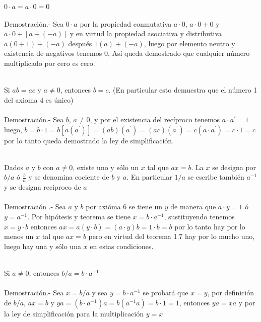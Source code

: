 \begin{teo}
$0\cdot a = a\cdot 0 =0$\\\\
Demostración.- \;
Sea $0\cdot a$ por la propiedad conmutativa $a\cdot 0$, $a\cdot 0 + 0$ y $a\cdot 0 + \left[a+(-a) \right]$ y en virtud la propiedad asociativa y distributiva $a(0 + 1)+(-a)$ después $1(a)+(-a)$, luego por elemento neutro y existencia de negativos tenemos $0$, Así queda demostrado que cualquier número multiplicado por cero es cero.\\\\ 
\end{teo}

\begin{teo} Si $ab=ac$ y $a \neq 0$, entonces $b=c$. (En particular esto demuestra que el número 1 del axioma 4 es único)\\\\
Demostración.- \;
Sea $b$, $a\neq 0$, y por el existencia del recíproco tenemos $a\cdot a^{'}=1 $  luego,  $b=b\cdot 1=b\left[a(a^{'})\right]=(ab)(a^{'})=(ac)(a^{'})=c(a\cdot a^{'})=c\cdot 1=c$ por lo tanto queda demostrado la ley de simplificación.\\\\
\end{teo}

\begin{teo} Dados $a$ y $b$ con $a\neq 0$, existe uno y sólo un $x$ tal que $ax=b$. La $x$ se designa por $b/a$ ó $\displaystyle\frac{b}{a}$ y se denomina cociente de $b$ y $a$. En particular $1/a$ se escribe también $a^{-1}$ y se designa recíproco de $a$\\\\
Demostración .- \;
Sea $a$ y $b$ por axióma 6 se tiene un $y$ de manera que $a\cdot y = 1$ ó $y = a^{-1}$. Por hipótesis y teorema se tiene $x=b\cdot a^{-1}$, sustituyendo tenemos $x=y\cdot b$ entonces $ax=a(y\cdot b)=(a\cdot y)b=1\cdot b = b$  por lo tanto hay por lo menos un $x$ tal que $ax=b$ pero en virtud del teorema 1.7 hay por lo mucho uno, luego hay una y sólo una $x$ en estas condiciones.\\\\ 
\end{teo}

\begin{teo}
Si $a\neq 0$, entonces $b/a=b\cdot a^{-1}$\\\\
Demostración.- \;
Sea $x =b/a$ y sea $y=b\cdot a^{-1}$ se probará que $x=y$, por definición de $b/a$, $ax=b$ y $ya=(b\cdot a^{-1})a=b(a^{-1}a)=b\cdot 1 = 1$, entonces $ya=xa$ y por la ley de simplificación para la multiplicación $y=x$ \\\\
\end{teo}

